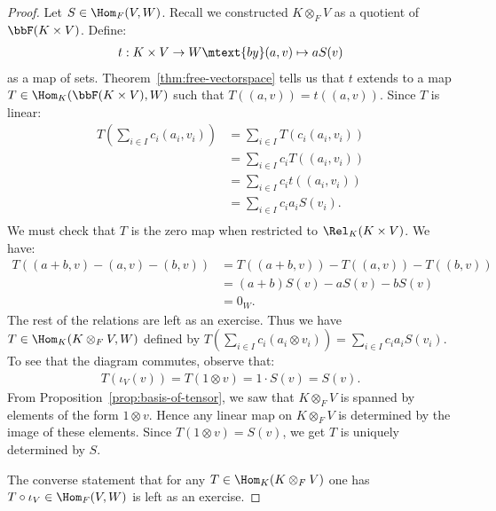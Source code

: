         \begin{proof}
            Let $S \in \Hom_F(V,W)$. Recall we constructed $K \otimes_F V$ as a quotient of $\bbF(K \times V)$. Define:
                \begin{equation*}
                \begin{split}
                    t: K \times V \rightarrow W \mtext{by} (a,v) \mapsto aS(v)
                \end{split}
                \end{equation*}
            as a map of sets. Theorem~\ref{thm:free-vectorspace} tells us that $t$ extends to a map $T \in \Hom_K(\bbF(K \times V), W)$ such that $T((a,v)) = t((a,v))$. Since $T$ is linear:
                \begin{equation*}
                \begin{split}
                    T \left(\sum_{i \in I} c_i(a_i,v_i)\right)
                    & = \sum_{i \in I}T(c_i(a_i,v_i)) \\
                    & = \sum_{i \in I}c_i T((a_i,v_i)) \\
                    & = \sum_{i \in I}c_i t((a_i,v_i)) \\
                    & = \sum_{i \in I}c_i a_i S(v_i). \\
                \end{split}
                \end{equation*}
            We must check that $T$ is the zero map when restricted to $\Rel_K(K \times V)$. We have:
                \begin{equation*}
                \begin{split}
                    T((a+b,v)-(a,v)-(b,v))
                    & = T((a+b,v)) - T((a,v)) - T((b,v)) \\
                    & = (a+b)S(v) - aS(v) - bS(v) \\
                    & = 0_W.
                \end{split}
                \end{equation*}
            The rest of the relations are left as an exercise. Thus we have $T \in \Hom_K(K \otimes_F V , W)$ defined by $T \left(\sum_{i \in I}c_i(a_i \otimes v_i)\right) = \sum_{i \in I}c_i a_i S(v_i)$. To see that the diagram commutes, observe that:
                \begin{equation*}
                \begin{split}
                    T(\iota_V(v)) = T(1 \otimes v) = 1 \cdot S(v) = S(v).
                \end{split}
                \end{equation*}
            From Proposition~\ref{prop:basis-of-tensor}, we saw that $K \otimes_F V$ is spanned by elements of the form $1 \otimes v$. Hence any linear map on $K \otimes_F V$ is determined by the image of these elements. Since $T(1 \otimes v) = S(v)$, we get $T$ is uniquely determined by $S$.

            The converse statement that for any $T \in \Hom_K(K \otimes_F V)$ one has $T \circ \iota_V \in \Hom_F(V,W)$ is left as an exercise.
        \end{proof}

